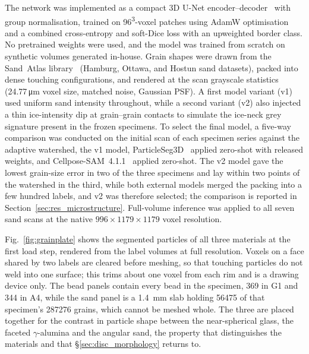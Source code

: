 \documentclass[preprint,12pt,numbers]{elsarticle}
\begin{document}
  The network was implemented as a compact 3D U-Net encoder--decoder~\cite{Cicek2016}
  with group normalisation, trained on 96\textsuperscript{3}-voxel patches using AdamW
  optimisation and a combined cross-entropy and soft-Dice loss with an upweighted
  border class.  No pretrained weights were used, and the model was trained from scratch on
  synthetic volumes generated in-house.  Grain shapes were drawn from the
  Sand~Atlas library~\cite{Vego2025} (Hamburg, Ottawa, and Hostun sand datasets),
  packed into dense touching configurations, and rendered at the scan grayscale
  statistics (24.77\,\si{\micro\meter} voxel size, matched noise, Gaussian PSF).
  A first model variant (v1) used uniform sand intensity throughout, while a
  second variant (v2) also injected a thin ice-intensity dip at grain--grain
  contacts to simulate the ice-neck grey signature present in the frozen
  specimens.  To select the final model, a five-way comparison was conducted on the
  initial scan of each specimen series against the adaptive watershed, the v1
  model, ParticleSeg3D~\cite{Gotkowski2024} applied zero-shot with released
  weights, and Cellpose-SAM~4.1.1~\cite{Pachitariu2025} applied zero-shot.  The v2 model
  gave the lowest grain-size error in two of the three specimens and lay
  within two points of the watershed in the third, while both external models
  merged the packing into a few hundred labels, and v2 was therefore selected;
  the comparison is reported in Section~\ref{sec:res_microstructure}.
  Full-volume inference was applied to all seven sand scans at the native
  $996\times1179\times1179$ voxel resolution.

  Fig.~\ref{fig:grainplate} shows the segmented particles of all three
  materials at the first load step, rendered from the label volumes at full
  resolution.  Voxels on a face shared by two labels are cleared before
  meshing, so that touching particles do not weld into one surface; this trims
  about one voxel from each rim and is a drawing device only.  The bead panels
  contain every bead in the specimen, 369 in G1 and 344 in A4, while the sand
  panel is a \SI{1.4}{\milli\meter} slab holding \num{56475} of that
  specimen's \num{287276} grains, which cannot be meshed whole.  The three are
  placed together for the contrast in particle shape between the
  near-spherical glass, the faceted $\gamma$-alumina and the angular sand, the
  property that distinguishes the materials and that
  \S\ref{sec:disc_morphology} returns to.
\end{document}
